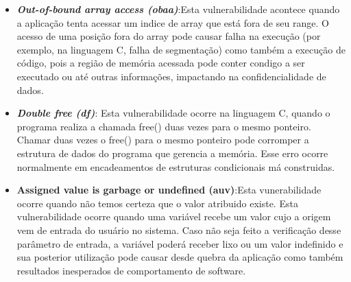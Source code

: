 \begin{itemize}
%

\item \textbf{\emph{Out-of-bound array access (obaa)}}:Esta vulnerabilidade acontece quando a aplicação tenta acessar um indice de array que está fora de seu range. O acesso de uma posição fora do array pode causar falha na execução (por exemplo, na linguagem C, falha de segmentação) como também a execução de código, pois a região de memória acessada pode conter condigo a ser executado ou até outras informações, impactando na confidencialidade de dados.

%

\item \textbf{\emph{Double free (df)}}: Esta vulnerabilidade ocorre na linguagem C, quando o programa realiza a chamada free() duas vezes para o mesmo ponteiro. Chamar duas vezes o free() para o mesmo ponteiro pode corromper a estrutura de dados do programa que gerencia a memória. Esse erro ocorre normalmente em encadeamentos de estruturas condicionais má construidas.

\item \textbf{Assigned value is garbage or undefined (auv)}:Esta vunerabilidade ocorre quando não temos certeza que o valor atribuido existe. Esta vulnerabilidade ocorre quando uma variável recebe um valor cujo a origem vem de entrada do usuário no sistema. Caso não seja feito a verificação desse parâmetro de entrada, a variável poderá receber lixo ou um valor indefinido e sua posterior utilização pode causar desde quebra da aplicação como também resultados inesperados de comportamento de software.

\end{itemize}

%


